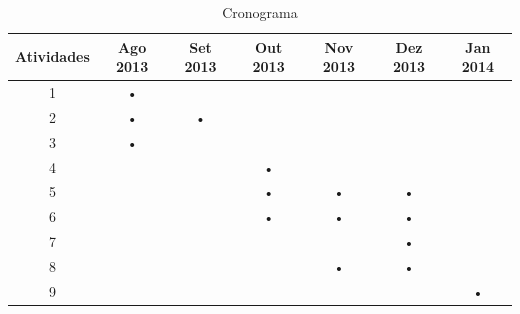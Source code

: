 \begin{table}[h]
	\centering
	
	\begin{tabular}{|c|c|c|c|c|c|c|}
		\hline
		\textbf{Atividades}	& \textbf{Ago 2013}	& \textbf{Set 2013}
		& \textbf{Out 2013}	& \textbf{Nov 2013}	& \textbf{Dez 2013}
		& \textbf{Jan 2014}	\\
		\hline\hline
		
		\hline
		1	& • 	&	&	&	&	&	\\
		\hline

		\hline
		2	& •	& •	&	&	&	&	\\
		\hline

		\hline
		3	& •	&	&	&	&	&	\\
		\hline

		\hline
		4	&	&	& •	&	&	&	\\
		\hline

		\hline
		5	& 	&	& •	& •	& •	&	\\
		\hline

		\hline
		6	& 	&	& •	& •	& •	&	\\
		\hline

		\hline
		7	& 	&	& 	& 	& •	&	\\
		\hline

		\hline
		8	& 	&	& 	& • 	& •	&	\\
		\hline

		\hline
		9	& 	&	& 	& 	& 	& •	\\
		\hline
	\end{tabular}

	\caption{Cronograma}	
	\label{cronograma}
\end{table}
